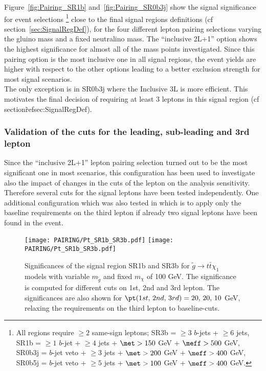 Figure~\ref{fig:Pairing_SR1b} and~\ref{fig:Pairing_SR0b3j} show the signal significance for event selections
\footnote{All regions require $\ge 2 $ same-sign leptons; 
SR3b = $\ge 3$ $b$-jets + $\ge 6$ jets, SR1b = $\ge 1$ $b$-jet + $\ge 4$ jets + $\met>150$ GeV + $\meff>500$ GeV, 
SR0b3j = $b$-jet veto + $\ge 3$ jets + $\met>200$ GeV + $\meff>400$ GeV, SR0b5j = $b$-jet veto + $\ge 5$ jets + $\met>100$ GeV + $\meff>400$ GeV.} 
close to the final signal regions definitions (cf section~\ref{sec:SignalRegDef}), 
for the four different lepton pairing selections varying the gluino mass and a fixed neutralino mass. 
The ``inclusive 2L+1'' option shows the highest significance for almost all of the mass points investigated.
Since this pairing option is the most inclusive one in all signal regions, the event yields are higher 
with respect to the other options leading to a better exclusion strength for most signal scenarios.\\
The only exception is in SR0b3j where the Inclusive 3L is more efficient. 
This motivates the final decision of requiring at least 3 leptons in this signal region (cf section\~ref{sec:SignalRegDef}).\\ 

\subsubsection{Validation of the \pt cuts for the leading, sub-leading and 3rd lepton}

Since the ``inclusive 2L+1'' lepton pairing selection turned out to be the most significant one in most scenarios, this configuration has been used to investigate also the impact of changes in the \pt cuts of the lepton on the analysis sensitivity. Therefore several \pt cuts for the signal leptons have been tested independently. One additional configuration which was also tested in which is to apply only the baseline requirements on the third lepton if already two signal leptons have been found in the event. 

\begin{figure}[!ht]
  \centering
  \texttt{[image: PAIRING/Pt\_SR1b\_SR3b.pdf]}
  \texttt{[image: PAIRING/Pt\_SR1b\_SR3b.pdf]}
  \caption{Significances of the signal region SR1b and SR3b for $\tilde{g} \rightarrow t \bar{t} \chi_{1}$ models with variable $m_{\tilde{g}}$ and fixed $m_{\chi}$ of 100 GeV. The significance is computed for different \pt cuts on 1st, 2nd and 3rd lepton. The significances are also shown for $\pt(1st, \, 2nd, \, 3rd) = 20, \, 20, \, 10 $ GeV, relaxing the requirements on the third lepton to baseline-cuts.}
  \label{fig:Pt_SR1b_SR3b}
\end{figure}

